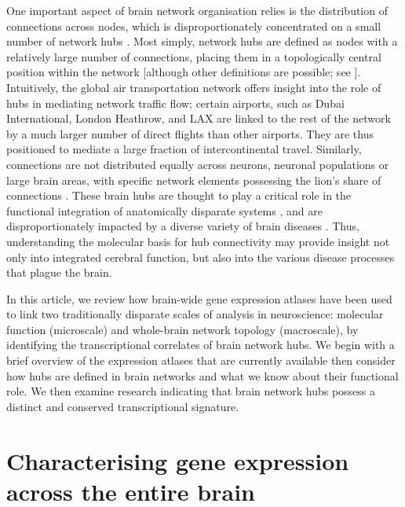 One important aspect of brain network organisation relies is the distribution of connections across nodes, which is disproportionately concentrated on a small number of network hubs \mbox{\citep{VandenHeuvel2011,Towlson2013}}. Most simply, network hubs are defined as nodes with a relatively large number of connections, placing them in a topologically central position within the network [although other definitions are possible; see \citep{Power2011,Oldham}].
Intuitively, the global air transportation network offers insight into the role of hubs in mediating network traffic flow; certain airports, such as Dubai International, London Heathrow, and LAX are linked to the rest of the network by a much larger number of direct flights than other airports. They are thus positioned to mediate a large fraction of intercontinental travel. Similarly, connections are not distributed equally across neurons, neuronal populations or large brain areas, with specific network elements possessing the lion’s share of connections \citep{VandenHeuvel2011,Towlson2013,DeReus2014,VandenHeuvel2016}.
These brain hubs are thought to play a critical role in the functional integration of anatomically disparate systems \citep{Harriger2012,VandenHeuvel2012}, and are disproportionately impacted by a diverse variety of brain diseases \citep{Crossley2014,Fornito2015}. Thus, understanding the molecular basis for hub connectivity may provide insight not only into integrated cerebral function, but also into the various disease processes that plague the brain.

In this article, we review how brain-wide gene expression atlases have been used to link two traditionally disparate scales of analysis in neuroscience: molecular function (microscale) and whole-brain network topology (macroscale), by identifying the transcriptional correlates of brain network hubs. We begin with a brief overview of the expression atlases that are currently available then consider how hubs are defined in brain networks and what we know about their functional role. We then examine research indicating that brain network hubs possess a distinct and conserved transcriptional signature.

\section{Characterising gene expression across the entire brain}

